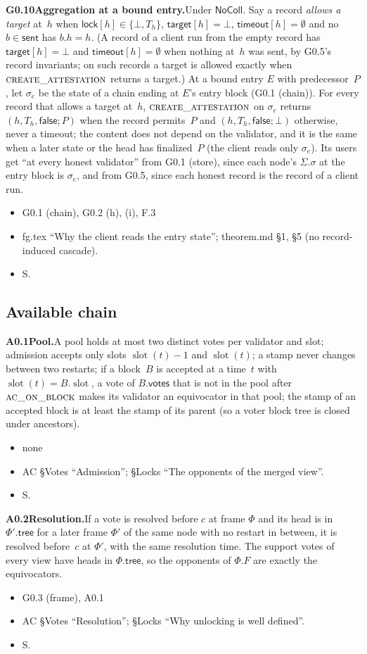 \documentclass{article}
\newcommand{\slot}{\operatorname{slot}}
\newcommand{\Fr}{\Phi}
\newcommand{\fname}[1]{\text{\textsc{#1}}}
\newcommand{\dagnode}[6]{%
\par\medskip\noindent\textbf{#1\enspace #2.}\enspace #3
\begin{itemize}[leftmargin=2.2em,itemsep=0pt,topsep=2pt]
\item[\emph{Uses}] #4
\item[\emph{Evid.}] #5
\item[\emph{Task}] #6
\end{itemize}}
\begin{document}
\dagnode{G0.10}{Aggregation at a bound entry}{Under $\mathsf{NoColl}$.  Say
a record \emph{allows a target} at~$h$ when $\mathsf{lock}[h]\in\{\bot,T_h\}$,
$\mathsf{target}[h]=\bot$, $\mathsf{timeout}[h]=\emptyset$ and no
$b\in\mathsf{sent}$ has $b.h=h$.  (A record of a client run from the empty
record has $\mathsf{target}[h]=\bot$ and $\mathsf{timeout}[h]=\emptyset$
when nothing at~$h$ was sent, by G0.5's record invariants; on such records a
target is allowed exactly when $\fname{create\_attestation}$ returns a
target.)  At a bound entry $E$ with
predecessor~$P$, let $\sigma_e$ be the state of a chain ending at $E$'s
entry block (G0.1 (chain)).  For every record that allows a target at~$h$,
$\fname{create\_attestation}$ on $\sigma_e$ returns $(h,T_h,\mathsf{false};P)$
when the record permits~$P$ and $(h,T_h,\mathsf{false};\bot)$ otherwise,
never a timeout; the content does not depend on the validator, and it is the
same when a later state or the head has finalized~$P$ (the client reads only
$\sigma_e$).  Its users get ``at every honest validator'' from G0.1 (store),
since each node's $\Sigma.\sigma$ at the entry block is $\sigma_e$, and from
G0.5, since each honest record is the record of a client run.}
{G0.1 (chain), G0.2 (h), (i), F.3}{fg.tex ``Why the client reads the entry state''; theorem.md
\S1, \S5 (no record-induced cascade).}{S.}

\subsection{Available chain}

\dagnode{A0.1}{Pool}{A pool holds at most two distinct votes per validator
and slot; admission accepts only slots $\slot(t)-1$ and $\slot(t)$; a stamp
never changes between two restarts; if a block~$B$ is accepted at a time~$t$
with $\slot(t)=B.\slot$, a vote of $B.\mathsf{votes}$ that is not in the pool
after $\fname{ac\_on\_block}$ makes its validator an equivocator in that pool;
the stamp of an accepted block is at least the stamp of its parent (so a voter
block tree is closed under ancestors).}
{none}{AC \S Votes ``Admission''; \S Locks ``The opponents of the merged view''.}{S.}

\dagnode{A0.2}{Resolution}{If a vote is resolved before $c$ at frame $\Fr$ and
its head is in $\Fr'.\mathsf{tree}$ for a later frame $\Fr'$ of the same node
with no restart in between, it is resolved before~$c$ at $\Fr'$, with the same
resolution time.  The support votes of every view have heads in
$\Fr.\mathsf{tree}$, so the opponents of $\Fr.F$ are exactly the
equivocators.}
{G0.3 (frame), A0.1}{AC \S Votes ``Resolution''; \S Locks ``Why unlocking is well defined''.}{S.}
\end{document}
